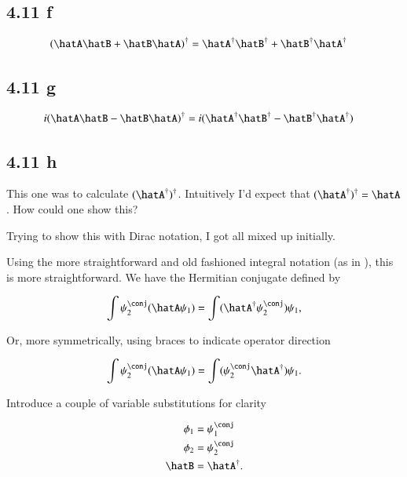\subsection{4.11 f}

\begin{align*}
(\hatA \hatB + \hatB \hatA)^\dagger &= \hatA^\dagger \hatB^\dagger + \hatB^\dagger \hatA^\dagger
\end{align*}

\subsection{4.11 g}

\begin{align*}
i (\hatA \hatB - \hatB \hatA)^\dagger &= i ( \hatA^\dagger \hatB^\dagger - \hatB^\dagger \hatA^\dagger)
\end{align*}

\subsection{4.11 h}

This one was to calculate $(\hatA^\dagger)^\dagger$.  Intuitively I'd expect that $(\hatA^\dagger)^\dagger = \hatA$.  How could one show this?

Trying to show this with Dirac notation, I got all mixed up initially.

Using the more straightforward and old fashioned integral notation (as in \cite{bohm1989qt}), this is more straightforward.  We have the Hermitian conjugate defined by

\begin{align*}
\int \psi_2^\conj (\hatA \psi_1) = \int (\hatA^\dagger \psi_2^\conj) \psi_1,
\end{align*}

Or, more symmetrically, using braces to indicate operator direction

\begin{align*}
\int \psi_2^\conj (\hatA \psi_1) = \int (\psi_2^\conj \hatA^\dagger) \psi_1.
\end{align*}

Introduce a couple of variable substitutions for clarity

\begin{align*}
\phi_1 &= \psi_1^\conj \\
\phi_2 &= \psi_2^\conj \\
\hatB &= \hatA^\dagger.
\end{align*}

